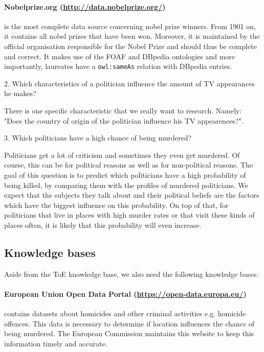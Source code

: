 \documentclass[12pt,a4paper]{article}
\begin{document}
\paragraph{\textbf{Nobelprize.org} (\url{http://data.nobelprize.org/})} is the most complete data source concerning nobel prize winners. From 1901 on, it contains all nobel prizes that have been won. Moreover, it is maintained by the official organisation responsible for the Nobel Prize and should thus be complete and correct. It makes use of the FOAF and DBpedia ontologies and more importantly, laureates have a \texttt{owl:sameAs} relation with DBpedia entries.
\vspace{1cm}

\begin{center}
	\Large
2. Which characteristics of a politician influence the amount of TV appearances he makes?
\end{center}

There is one specific characteristic that we really want to research. Namely: "Does the country of origin of the politician influence his TV appearences?". 

\begin{center}
	\Large
3. Which politicians have a high chance of being murdered?
\end{center}

Politicians get a lot of criticism and sometimes they even get murdered. Of course, this can be for political reasons as well as for non-political reasons. The goal of this question is to predict which politicians have a high probability of being killed, by comparing them with the profiles of murdered politicians. We expect that the subjects they talk about and their political beliefs are the factors which have the biggest influence on this probability. On top of that, for politicians that live in places with high murder rates or that visit these kinds of places often, it is likely that this probability will even increase.  

\subsection*{Knowledge bases}

Aside from the ToE knowledge base, we also need the following knowledge bases:

\paragraph{\textbf{European Union Open Data Portal} (\url{https://open-data.europa.eu/})} contains datasets about homicides and other criminal activities e.g. homicide offences. This data is necessary to determine if location influences the chance of being murdered. The European Commission maintains this website to keep this information timely and accurate.
\end{document}
